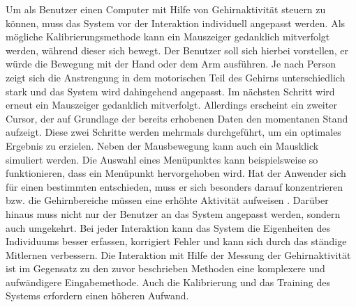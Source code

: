 \newline \newline
Um als Benutzer einen Computer mit Hilfe von Gehirnaktivität steuern zu können, muss das System vor der Interaktion individuell angepasst werden. Als mögliche Kalibrierungsmethode kann ein Mauszeiger gedanklich mitverfolgt werden, während dieser sich bewegt. Der Benutzer soll sich hierbei vorstellen, er würde die Bewegung mit der Hand oder dem Arm ausführen. Je nach Person zeigt sich die Anstrengung in dem motorischen Teil des Gehirns unterschiedlich stark und das System wird dahingehend angepasst. Im nächsten Schritt wird erneut ein Mauszeiger gedanklich mitverfolgt. Allerdings erscheint ein zweiter Cursor, der auf Grundlage der bereits erhobenen Daten den momentanen Stand aufzeigt. Diese zwei Schritte werden mehrmals durchgeführt, um ein optimales Ergebnis zu erzielen. Neben der Mausbewegung kann auch ein Mausklick simuliert werden. Die Auswahl eines Menüpunktes kann beispielsweise so funktionieren, dass ein Menüpunkt hervorgehoben wird. Hat der Anwender sich für einen bestimmten entschieden, muss er sich besonders darauf konzentrieren bzw. die Gehirnbereiche müssen eine erhöhte Aktivität aufweisen \cite{BrainInt}.
\newline
Darüber hinaus muss nicht nur der Benutzer an das System angepasst werden, sondern auch umgekehrt. Bei jeder Interaktion kann das System die Eigenheiten des Individuums besser erfassen, korrigiert Fehler und kann sich durch das ständige Mitlernen verbessern. 
\newline \newline
Die Interaktion mit Hilfe der Messung der Gehirnaktivität ist im Gegensatz zu den zuvor beschrieben Methoden eine komplexere und aufwändigere Eingabemethode. Auch die Kalibrierung und das Training des Systems erfordern einen höheren Aufwand.
